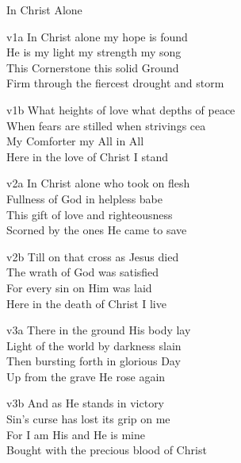 \begin{song}{In Christ Alone}

    \begin{songframe}{v1a}
    In Christ alone my hope is found \\
    He is my light my strength my song \\
    This Cornerstone this solid Ground \\
    Firm through the fiercest drought and storm
    \end{songframe}

    \begin{songframe}{v1b}
        What heights of love what depths of peace \\
    When fears are stilled when strivings cea\\
    My Comforter my All in All \\
    Here in the love of Christ I stand
    \end{songframe}

    \begin{songframe}{v2a}
    In Christ alone who took on flesh \\
    Fullness of God in helpless babe \\
    This gift of love and righteousness \\
    Scorned by the ones He came to save
    \end{songframe}

    \begin{songframe}{v2b}
    Till on that cross as Jesus died \\
    The wrath of God was satisfied \\
    For every sin on Him was laid \\
    Here in the death of Christ I live
    \end{songframe}

    \begin{songframe}{v3a}
    There in the ground His body lay \\
    Light of the world by darkness slain \\
    Then bursting forth in glorious Day \\
    Up from the grave He rose again
    \end{songframe}

    \begin{songframe}{v3b}
    And as He stands in victory \\
    Sin's curse has lost its grip on me \\
    For I am His and He is mine \\
    Bought with the precious blood of Christ
    \end{songframe}



\end{song}
